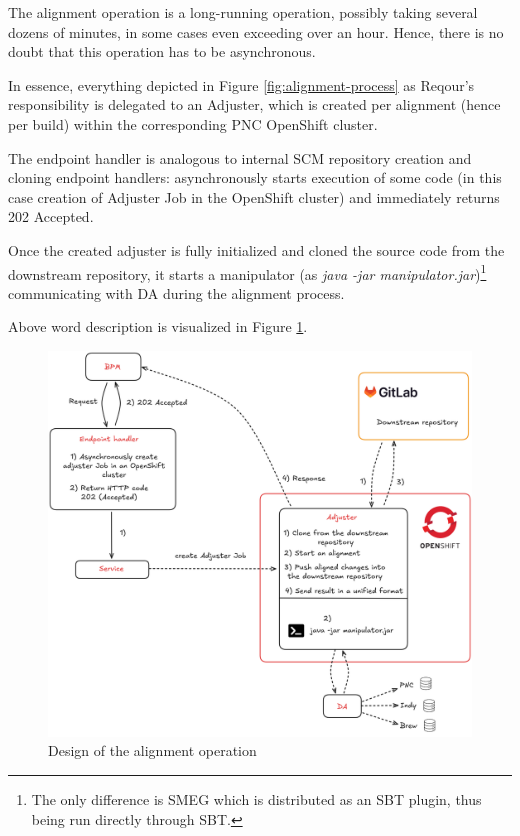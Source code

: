 \documentclass[../main.tex]{subfiles}
\begin{document}
The alignment operation is a long-running operation, possibly taking several dozens of minutes, in some cases even exceeding over an hour. Hence, there is no doubt that this operation has to be asynchronous.

In essence, everything depicted in Figure \ref{fig:alignment-process} as Reqour's responsibility is delegated to an Adjuster, which is created per alignment (hence per build) within the corresponding PNC OpenShift cluster.

The endpoint handler is analogous to internal SCM repository creation and cloning endpoint handlers: asynchronously starts execution of some code (in this case creation of Adjuster Job in the OpenShift cluster) and immediately returns 202 Accepted.

Once the created adjuster is fully initialized and cloned the source code from the downstream repository, it starts a manipulator (as \textit{java -jar manipulator.jar})\footnote{The only difference is SMEG which is distributed as an SBT plugin, thus being run directly through SBT.} communicating with DA during the alignment process.

Above word description is visualized in Figure \ref{fig:alignment-design}.

\begin{figure}
  \begin{center}
    \includegraphics[width=\textwidth]{images/alignment-design.png}
  \end{center}
  \caption{Design of the alignment operation}
  \label{fig:alignment-design}
\end{figure}
\end{document}
